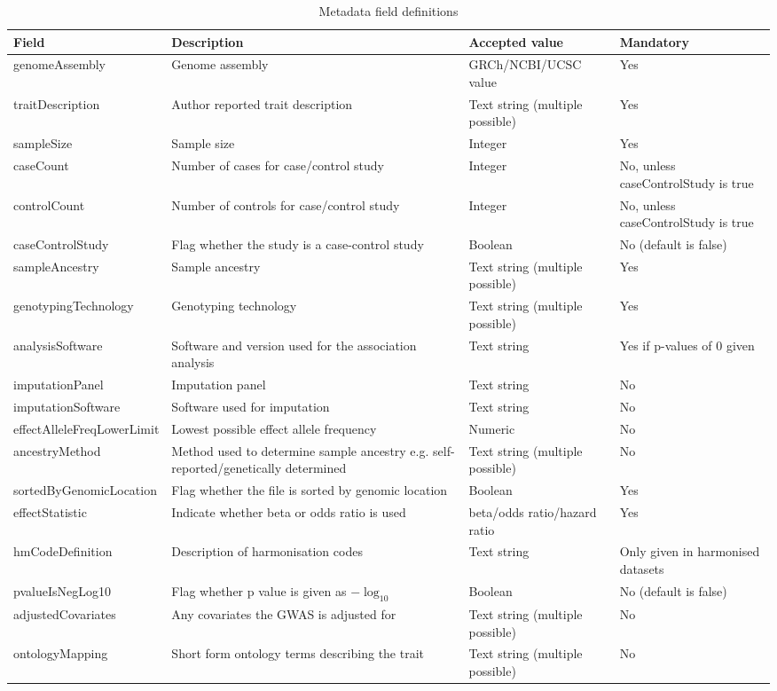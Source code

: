 \documentclass[11pt]{article}
\begin{document}
\begin{table}[h]
 \caption{Metadata field definitions}
 \centering
 \begin{tabularx}{\textwidth} { 
   | >{\hsize=1.4\hsize\centering\arraybackslash}X 
   | >{\hsize=1\hsize\centering\arraybackslash}X 
   | >{\hsize=1\hsize\centering\arraybackslash}X 
   | >{\hsize=0.6\hsize\centering\arraybackslash}X | } 
  \hline
  Field & Description & Accepted value & Mandatory \\
  \hline
  genomeAssembly & Genome assembly & GRCh/NCBI/UCSC value & Yes\\
  traitDescription & Author reported trait description & Text string (multiple possible) & Yes\\
  sampleSize & Sample size & Integer & Yes\\
  caseCount & Number of cases for case/control study & Integer & No, unless caseControlStudy is true\\
  controlCount & Number of controls for case/control study & Integer & No, unless caseControlStudy is true\\
  caseControlStudy & Flag whether the study is a case-control study & Boolean & No (default is false)\\
  sampleAncestry & Sample ancestry & Text string (multiple possible) & Yes\\
  genotypingTechnology & Genotyping technology & Text string (multiple possible) & Yes\\
  analysisSoftware & Software and version used for the association analysis & Text string & Yes if p-values of 0 given\\
  imputationPanel & Imputation panel & Text string & No\\
  imputationSoftware & Software used for imputation & Text string & No\\
  effectAlleleFreqLowerLimit & Lowest possible effect allele frequency & Numeric & No\\
  ancestryMethod & Method used to determine sample ancestry e.g. self-reported/genetically determined  & Text string (multiple possible) & No\\
  sortedByGenomicLocation & Flag whether the file is sorted by genomic location & Boolean & Yes\\
  effectStatistic & Indicate whether beta or odds ratio is used & beta/odds ratio/hazard ratio & Yes\\
  hmCodeDefinition & Description of harmonisation codes & Text string & Only given in harmonised datasets\\
  pvalueIsNegLog10 & Flag whether p value is given as $-\log_{10}$ & Boolean & No (default is false)\\
  adjustedCovariates & Any covariates the GWAS is adjusted for & Text string (multiple possible) & No\\
  ontologyMapping & Short form ontology terms describing the trait & Text string (multiple possible) & No\\
  \hline
 \end{tabularx}
 \label{tab:metadata_fields}
\end{table}
\end{document}
